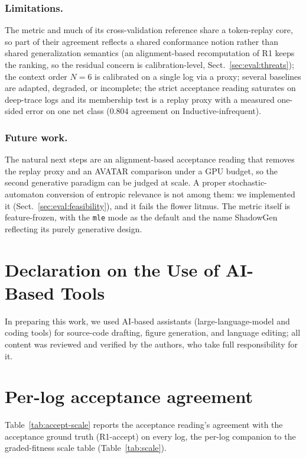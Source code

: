 \documentclass[runningheads]{llncs}
\newcommand{\chg}[1]{\textcolor{chgblue}{#1}}
\begin{document}
\subsubsection{Limitations.}
The metric and much of its cross-validation reference share a token-replay core, so part of their agreement reflects a shared conformance notion rather than shared generalization semantics (an alignment-based recomputation of R1 keeps the ranking, so the residual concern is calibration-level, Sect.~\ref{sec:eval:threats}); the context order $N{=}6$ is calibrated on a single log via a proxy; several baselines are adapted, degraded, or incomplete\chg{; the strict acceptance reading saturates on deep-trace logs and its membership test is a replay proxy with a measured one-sided error on one net class ($0.804$ agreement on Inductive-infrequent)}.

\subsubsection{Future work.}
\chg{The natural next steps are an alignment-based acceptance reading that removes the replay proxy and an AVATAR comparison under a GPU budget, so the second generative paradigm can be judged at scale. A proper stochastic-automaton conversion of entropic relevance is not among them: we implemented it (Sect.~\ref{sec:eval:feasibility}), and it fails the flower litmus.} The metric itself is feature-frozen, with the \texttt{mle} mode as the default and the name ShadowGen reflecting its purely generative design.

\section*{Declaration on the Use of AI-Based Tools}
In preparing this work, we used AI-based assistants (large-language-model and coding
tools) for source-code drafting, figure generation, and language editing; all content
was reviewed and verified by the authors, who take full responsibility for it.

\appendix
\section{Per-log acceptance agreement}
\label{sec:appendix:accept}
\chg{Table~\ref{tab:accept-scale} reports the acceptance reading's agreement with the acceptance ground truth (R1-accept) on every log, the per-log companion to the graded-fitness scale table (Table~\ref{tab:scale}).}
\end{document}
